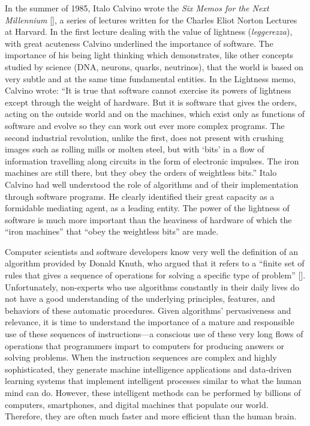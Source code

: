 In the summer of 1985, Italo Calvino wrote the \textit{Six Memos for the Next Millennium} [\citealt{chap:prolog:Calvino:2016}], a series of lectures written for the Charles Eliot Norton Lectures at Harvard. In the first lecture dealing with the value of lightness (\textit{leggerezza}), with great acuteness Calvino underlined the importance of software. The importance of his being light thinking which demonstrates, like other concepts studied by science (DNA, neurons, quarks, neutrinos), that the world is based on very subtle and at the same time fundamental entities. In the Lightness memo, Calvino wrote: ``It is true that software cannot exercise its powers of lightness except through the weight of hardware. But it is software that gives the orders, acting on the outside world and on the machines, which exist only as functions of software and evolve so they can work out ever more complex programs. The second industrial revolution, unlike the first, does not present with crushing images such as rolling mills or molten steel, but with `bits' in a flow of information travelling along circuits in the form of electronic impulses. The iron machines are still there, but they obey the orders of weightless bits.'' Italo Calvino\vadjust{\pagebreak} had well understood the role of algorithms and of their implementation through software programs. He clearly identified their great capacity as a formidable mediating agent, as a leading entity. The power of the lightness of software is much more important than the heaviness of hardware of which the ``iron machines'' that ``obey the weightless bits'' are made.

Computer scientists and software developers know very well the definition of an algorithm provided by Donald Knuth, who argued that it refers to a ``finite set of rules that gives a sequence of operations for solving a specific type of problem'' [\citealt{chap:prolog:Knuth:1997}]. Unfortunately, non-experts who use algorithms constantly in their daily lives do not have a good understanding of the underlying principles, features, and behaviors of these automatic procedures. Given algorithms' pervasiveness and relevance, it is time to understand the importance of a mature and responsible use of these sequences of instructions---a conscious use of these very long flows of operations that programmers impart to computers for producing answers or solving problems. When the instruction sequences are complex and highly sophisticated, they generate machine intelligence applications and data-driven learning systems that implement intelligent processes similar to what the human mind can do. However, these intelligent methods can be performed by billions of computers, smartphones, and digital machines that populate our world. Therefore, they are often much faster and more efficient than the human brain.

